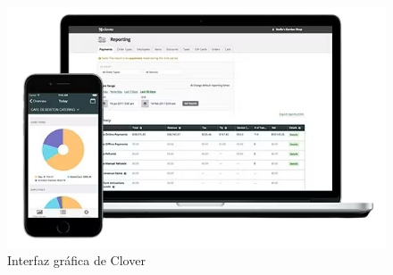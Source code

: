 \begin{figure}[H]
	\centering
	\includegraphics[width=1\textwidth]{imagenes/aplicacionesSimilares/clover.png}
	\caption{Interfaz gráfica de Clover}
\end{figure}


